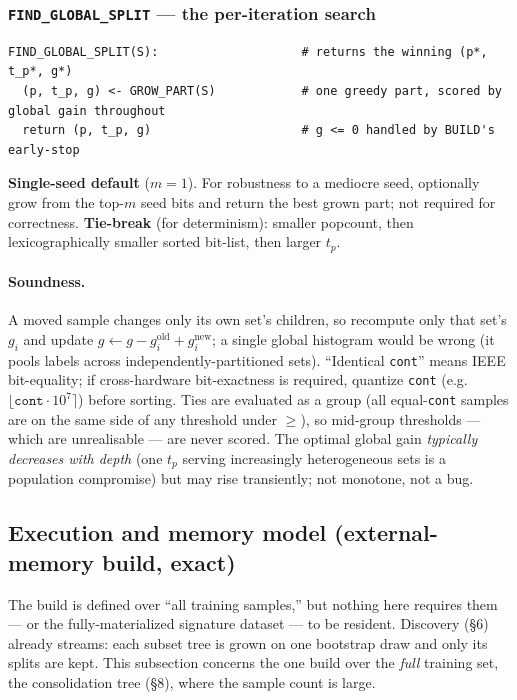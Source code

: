 \documentclass[11pt]{article}
\newcommand{\code}[1]{\texttt{#1}}
\newcommand{\cont}{\code{cont}}
\begin{document}
\subsubsection{\texorpdfstring{\code{FIND\_GLOBAL\_SPLIT}}{FIND\_GLOBAL\_SPLIT} --- the per-iteration search}
\begin{lstlisting}
FIND_GLOBAL_SPLIT(S):                    # returns the winning (p*, t_p*, g*)
  (p, t_p, g) <- GROW_PART(S)            # one greedy part, scored by global gain throughout
  return (p, t_p, g)                     # g <= 0 handled by BUILD's early-stop
\end{lstlisting}
\textbf{Single-seed default} ($m{=}1$). For robustness to a mediocre seed, optionally grow from the top-$m$ seed bits and return the best grown part; not required for correctness. \textbf{Tie-break} (for determinism): smaller popcount, then lexicographically smaller sorted bit-list, then larger $t_p$.

\paragraph{Soundness.} A moved sample changes only its own set's children, so recompute only that set's $g_i$ and update $g\leftarrow g-g_i^{\text{old}}+g_i^{\text{new}}$; a single global histogram would be wrong (it pools labels across independently-partitioned sets). ``Identical \cont'' means IEEE bit-equality; if cross-hardware bit-exactness is required, quantize \cont{} (e.g. $\lfloor \cont\cdot10^7\rceil$) before sorting. Ties are evaluated as a group (all equal-\cont{} samples are on the same side of any threshold under $\ge$), so mid-group thresholds --- which are unrealisable --- are never scored. The optimal global gain \emph{typically decreases with depth} (one $t_p$ serving increasingly heterogeneous sets is a population compromise) but may rise transiently; not monotone, not a bug.

\subsection{Execution and memory model (external-memory build, exact)}
The build is defined over ``all training samples,'' but nothing here requires them --- or the fully-materialized signature dataset --- to be resident. Discovery (\S6) already streams: each subset tree is grown on one bootstrap draw and only its splits are kept. This subsection concerns the one build over the \emph{full} training set, the consolidation tree (\S8), where the sample count is large.
\end{document}
